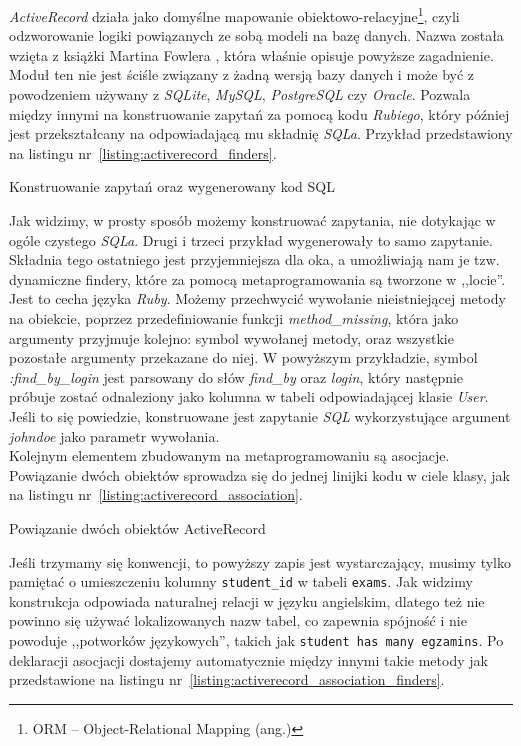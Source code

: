 \documentclass[12pt,twoside]{report}
\begin{document}
\emph{ActiveRecord} działa jako domyślne mapowanie
obiektowo-relacyjne\footnote{ORM -- Object-Relational Mapping (ang.)},
czyli odzworowanie logiki powiązanych ze sobą modeli na bazę danych.
Nazwa została wzięta z książki Martina Fowlera \cite{martin-fowler}, która
właśnie opisuje powyższe zagadnienie. Moduł ten nie jest ściśle związany z żadną
wersją bazy danych i może być z powodzeniem używany z \emph{SQLite},
\emph{MySQL}, \emph{PostgreSQL} czy \emph{Oracle}. Pozwala między innymi na
konstruowanie zapytań za pomocą kodu \emph{Rubiego}, który później jest
przekształcany na odpowiadającą mu składnię \emph{SQLa}.
Przykład przedstawiony na listingu nr~\ref{listing:activerecord_finders}.

\begin{listing}
  
  \caption{Konstruowanie zapytań oraz wygenerowany kod SQL}
  \label{listing:activerecord_finders}
\end{listing}


Jak widzimy, w prosty sposób możemy konstruować zapytania, nie dotykając w ogóle
czystego \emph{SQLa}. Drugi i trzeci przykład wygenerowały to samo zapytanie.
Składnia tego ostatniego jest przyjemniejsza dla oka, a umożliwiają nam je tzw.
dynamiczne findery, które za pomocą metaprogramowania są tworzone w ,,locie''.
Jest to cecha języka \emph{Ruby}. Możemy przechwycić wywołanie nieistniejącej
metody na obiekcie, poprzez przedefiniowanie funkcji \emph{method\_missing},
która jako argumenty przyjmuje kolejno: symbol wywołanej metody, oraz wszystkie
pozostałe argumenty przekazane do niej. W powyższym przykładzie, symbol
\emph{:find\_by\_login} jest parsowany do słów \emph{find\_by} oraz \emph{login}, który
następnie próbuje zostać odnaleziony jako kolumna w tabeli odpowiadającej klasie
\emph{User}. Jeśli to się powiedzie, konstruowane jest zapytanie \emph{SQL}
wykorzystujące argument \emph{johndoe} jako parametr wywołania.\\
Kolejnym elementem zbudowanym na metaprogramowaniu są asocjacje. Powiązanie
dwóch obiektów sprowadza się do jednej linijki kodu w ciele klasy, jak na
listingu nr~\ref{listing:activerecord_association}.

\begin{listing}
  
  \caption{Powiązanie dwóch obiektów ActiveRecord}
  \label{listing:activerecord_association}
\end{listing}


Jeśli trzymamy się konwencji, to powyższy zapis jest wystarczający, musimy tylko
pamiętać o umieszczeniu kolumny \texttt{student\_id} w tabeli \texttt{exams}. Jak
widzimy konstrukcja odpowiada naturalnej relacji w języku angielskim, dlatego
też nie powinno się używać lokalizowanych nazw tabel, co zapewnia spójność i
nie powoduje ,,potworków językowych'', takich jak \texttt{student has many
egzamins}. Po deklaracji asocjacji dostajemy automatycznie między innymi takie
metody jak przedstawione na listingu nr~\ref{listing:activerecord_association_finders}.
\end{document}

